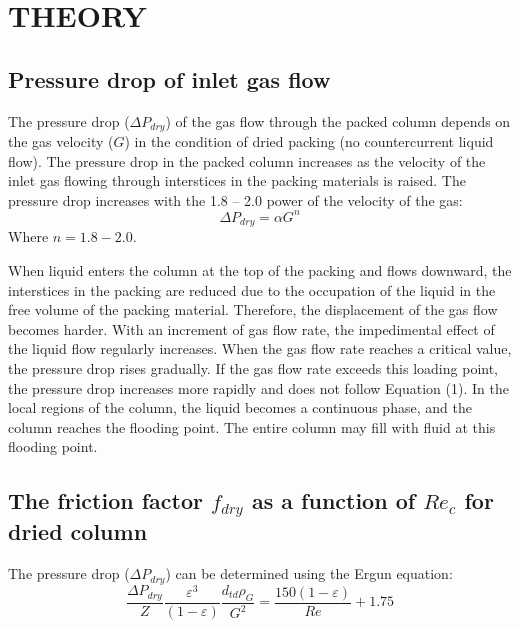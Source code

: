 \section{THEORY}

\subsection{Pressure drop of inlet gas flow}
The pressure drop ($\Delta P_{dry}$) of the gas flow through the packed column depends on the gas velocity ($G$) in the condition of dried packing (no countercurrent liquid flow). The pressure drop in the packed column increases as the velocity of the inlet gas flowing through interstices in the packing materials is raised. The pressure drop increases with the 1.8 -- 2.0 power of the velocity of the gas:
\begin{equation}
    \Delta P_{dry} = \alpha G^n
\end{equation}
Where $n = 1.8 - 2.0$.

When liquid enters the column at the top of the packing and flows downward, the interstices in the packing are reduced due to the occupation of the liquid in the free volume of the packing material. Therefore, the displacement of the gas flow becomes harder. With an increment of gas flow rate, the impedimental effect of the liquid flow regularly increases. When the gas flow rate reaches a critical value, the pressure drop rises gradually. If the gas flow rate exceeds this loading point, the pressure drop increases more rapidly and does not follow Equation (1). In the local regions of the column, the liquid becomes a continuous phase, and the column reaches the flooding point. The entire column may fill with fluid at this flooding point.

\subsection{The friction factor \texorpdfstring{$f_{dry}$}{f\_dry} as a function of \texorpdfstring{$Re_c$}{Re\_c} for dried column}
The pressure drop ($\Delta P_{dry}$) can be determined using the Ergun equation:
\begin{equation}
    \frac{\Delta P_{dry}}{Z} \frac{\varepsilon^3}{(1-\varepsilon)} \frac{d_{td} \rho_G}{G^2} = \frac{150(1-\varepsilon)}{Re} + 1.75
\end{equation}

